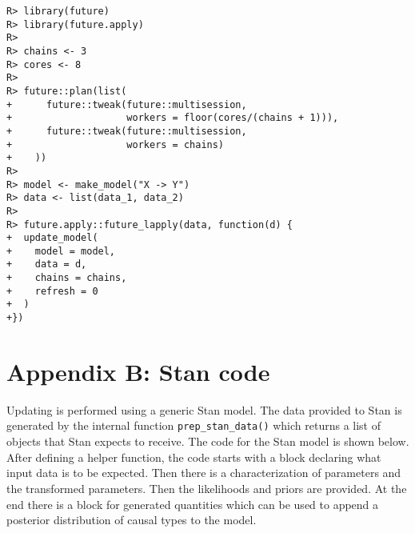 \documentclass[
  11pt,
  article]{jss}
\begin{document}
\begin{verbatim}
R> library(future)
R> library(future.apply)
R> 
R> chains <- 3
R> cores <- 8
R> 
R> future::plan(list(
+      future::tweak(future::multisession, 
+                    workers = floor(cores/(chains + 1))),
+      future::tweak(future::multisession, 
+                    workers = chains)
+    ))
R> 
R> model <- make_model("X -> Y")
R> data <- list(data_1, data_2)
R> 
R> future.apply::future_lapply(data, function(d) {
+  update_model(
+    model = model,
+    data = d,
+    chains = chains,
+    refresh = 0
+  )
+})
\end{verbatim}

\hypertarget{sec-stancode}{%
\section*{Appendix B: Stan code}\label{sec-stancode}}

Updating is performed using a generic Stan model. The data provided to
Stan is generated by the internal function \texttt{prep\_stan\_data()}
which returns a list of objects that Stan expects to receive. The code
for the Stan model is shown below. After defining a helper function, the
code starts with a block declaring what input data is to be expected.
Then there is a characterization of parameters and the transformed
parameters. Then the likelihoods and priors are provided. At the end
there is a block for generated quantities which can be used to append a
posterior distribution of causal types to the model.
\end{document}
